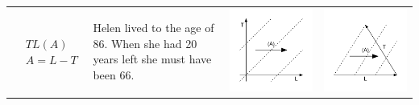 \documentclass[12pt,oneside,letter]{article} %
\begin{document}
\begin{center}
\begin{longtable}{m{}m{}m{}m{}}
  \midrule
  $$\begin{aligned}
    &TL(A) \\
    &A = L - T
  \end{aligned}$$ &
  Helen lived to the age of 86. When she had 20 years left she must have been
  66. & \includegraphics[width = \linewidth]{Figures/JonasTable/TLa.pdf} &
  \includegraphics[width = \linewidth]{Figures/JonasTable/TLa_iso.pdf}  \\

\end{longtable}
\end{center}
\end{document}
